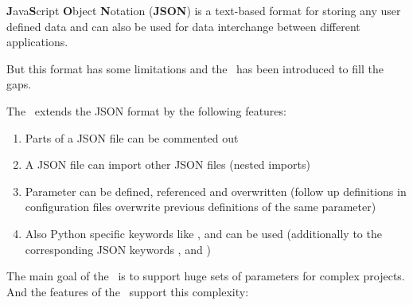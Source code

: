 



\textbf{J}ava\textbf{S}cript \textbf{O}bject \textbf{N}otation (\textbf{JSON}) is a text-based format for storing any user defined data and can also be used
for data interchange between different applications.

But this format has some limitations and the \pkg\ has been introduced to fill the gaps.

The \pkg\ extends the JSON format by the following features:

\begin{enumerate}
   \item Parts of a JSON file can be commented out
   \item A JSON file can import other JSON files (nested imports)
   \item Parameter can be defined, referenced and overwritten (follow up definitions in configuration files overwrite previous definitions of the same parameter)
   \item Also Python specific keywords like ,  and  can be used (additionally to the corresponding JSON keywords ,
          and )
\end{enumerate}

The main goal of the \pkg\ is to support huge sets of parameters for complex projects. And the features of the \pkg\ support this complexity:

